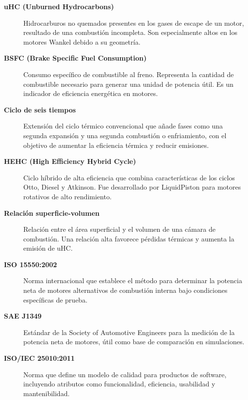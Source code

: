 \documentclass{LS}
\begin{document}
\begin{description}

  \item[\textbf{uHC (Unburned Hydrocarbons)}] Hidrocarburos no quemados presentes en los gases de escape de un motor, resultado de una combustión incompleta. Son especialmente altos en los motores Wankel debido a su geometría. \cite{kuppa2019, cole1976}

  \item[\textbf{BSFC (Brake Specific Fuel Consumption)}] Consumo específico de combustible al freno. Representa la cantidad de combustible necesario para generar una unidad de potencia útil. Es un indicador de eficiencia energética en motores. \cite{griffith1984}

  \item[\textbf{Ciclo de seis tiempos}] Extensión del ciclo térmico convencional que añade fases como una segunda expansión y una segunda combustión o enfriamiento, con el objetivo de aumentar la eficiencia térmica y reducir emisiones. \cite{bajulaz1989, pande2015}

  \item[\textbf{HEHC (High Efficiency Hybrid Cycle)}] Ciclo híbrido de alta eficiencia que combina características de los ciclos Otto, Diesel y Atkinson. Fue desarrollado por LiquidPiston para motores rotativos de alto rendimiento. \cite{liquidpiston2023}

  \item[\textbf{Relación superficie-volumen}] Relación entre el área superficial y el volumen de una cámara de combustión. Una relación alta favorece pérdidas térmicas y aumenta la emisión de uHC. \cite{yamamoto1972}

  \item[\textbf{ISO 15550:2002}] Norma internacional que establece el método para determinar la potencia neta de motores alternativos de combustión interna bajo condiciones específicas de prueba. \cite{iso15550}

  \item[\textbf{SAE J1349}] Estándar de la Society of Automotive Engineers para la medición de la potencia neta de motores, útil como base de comparación en simulaciones. \cite{saeJ1349}

  \item[\textbf{ISO/IEC 25010:2011}] Norma que define un modelo de calidad para productos de software, incluyendo atributos como funcionalidad, eficiencia, usabilidad y mantenibilidad. \cite{iso25010}


\end{description}
\end{document}
